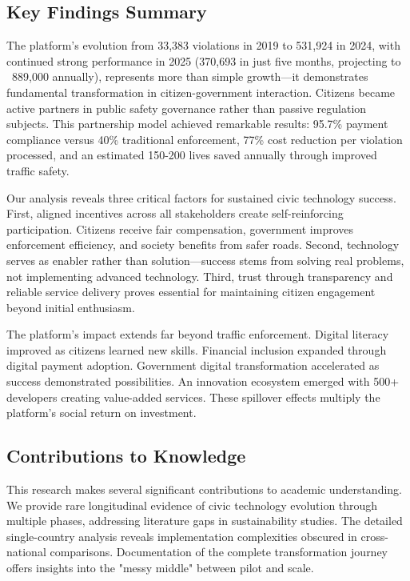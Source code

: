 \documentclass[pdflatex,sn-mathphys-num]{sn-jnl}%
\theoremstyle{thmstyleone}%
\theoremstyle{thmstyletwo}%
\theoremstyle{thmstylethree}%
\begin{document}
\subsection{Key Findings Summary}\label{subsec23}

The platform's evolution from 33,383 violations in 2019 to 531,924 in 2024, with continued strong performance in 2025 (370,693 in just five months, projecting to ~889,000 annually), represents more than simple growth—it demonstrates fundamental transformation in citizen-government interaction. Citizens became active partners in public safety governance rather than passive regulation subjects. This partnership model achieved remarkable results: 95.7\% payment compliance versus 40\% traditional enforcement, 77\% cost reduction per violation processed, and an estimated 150-200 lives saved annually through improved traffic safety.

Our analysis reveals three critical factors for sustained civic technology success. First, aligned incentives across all stakeholders create self-reinforcing participation. Citizens receive fair compensation, government improves enforcement efficiency, and society benefits from safer roads. Second, technology serves as enabler rather than solution—success stems from solving real problems, not implementing advanced technology. Third, trust through transparency and reliable service delivery proves essential for maintaining citizen engagement beyond initial enthusiasm.

The platform's impact extends far beyond traffic enforcement. Digital literacy improved as citizens learned new skills. Financial inclusion expanded through digital payment adoption. Government digital transformation accelerated as success demonstrated possibilities. An innovation ecosystem emerged with 500+ developers creating value-added services. These spillover effects multiply the platform's social return on investment.

\subsection{Contributions to Knowledge}\label{subsec24}

This research makes several significant contributions to academic understanding. We provide rare longitudinal evidence of civic technology evolution through multiple phases, addressing literature gaps in sustainability studies. The detailed single-country analysis reveals implementation complexities obscured in cross-national comparisons. Documentation of the complete transformation journey offers insights into the "messy middle" between pilot and scale.
\end{document}

